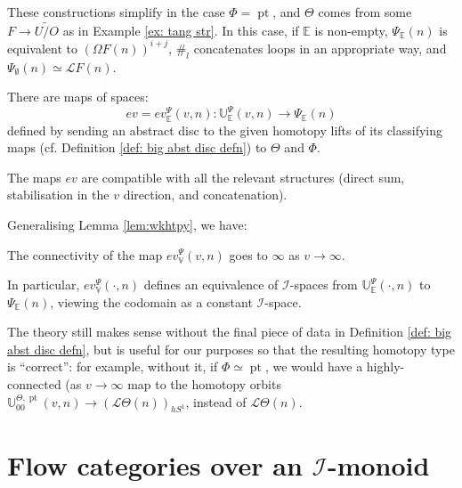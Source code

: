 \documentclass{TPmod}
\newcommand{\pt}{\operatorname{pt}}
\def\bE{\mathbb{E}}
\def\bU{\mathbb{U}}
\def\bV{\mathbb{V}}
\newcommand{\cI}{\mathcal{I}}
\newcommand{\cL}{\mathcal{L}}
\numberwithin{equation}{section}
\begin{document}
    \begin{rmk}
        These constructions simplify in the case $\Phi = \pt$, and $\Theta$ comes from some $F \to \widetilde{U/O}$ as in Example \ref{ex: tang str}. In this case, if $\bE$ is non-empty, $\Psi_\bE(n)$ is equivalent to $(\Omega F(n))^{i+j}$, $\#_l$ concatenates loops in an appropriate way, and $\Psi_\emptyset(n) \simeq \cL F(n)$.
    \end{rmk}


    \begin{defn}
        There are maps of spaces:
        \begin{equation}
            ev=ev^\Psi_\bE(v, n): \bU^\Psi_\bE(v, n) \to \Psi_\bE(n)
        \end{equation}
        defined by sending an abstract disc to the given homotopy lifts of its classifying maps (cf. Definition \ref{def: big abst disc defn}) to $\Theta$ and $\Phi$.
    \end{defn}
    The maps $ev$ are compatible with all the relevant structures (direct sum, stabilisation in the $v$ direction, and concatenation).


    Generalising Lemma \ref{lem:wkhtpy}, we have:

    \begin{lem}[{\cite[Lemma 3.31]{PS2}}]
        The connectivity of the map $ev^\Psi_\bV(v, n)$ goes to $\infty$ as $v \to \infty$.

        In particular, $ev^\Psi_\bV(\cdot, n)$ defines an equivalence of $\cI$-spaces from $\bU^\Psi_\bE(\cdot, n)$ to $\Psi_\bE(n)$, viewing the codomain as a constant $\cI$-space.
    \end{lem}

    \begin{rmk}
        The theory still makes sense without the final piece of data in Definition \ref{def: big abst disc defn}, but is useful for our purposes so that the resulting homotopy type is ``correct'': for example, without it, if $\Phi \simeq \pt$, we would have a highly-connected (as $v \to \infty$ map to the homotopy orbits $\bU_{00}^{\Theta,\pt}(v, n) \to (\cL \Theta(n))_{hS^1}$, instead of $\cL \Theta(n)$.
    \end{rmk}






\section{Flow categories over an $\cI$-monoid}\label{sec: flow}
\end{document}
